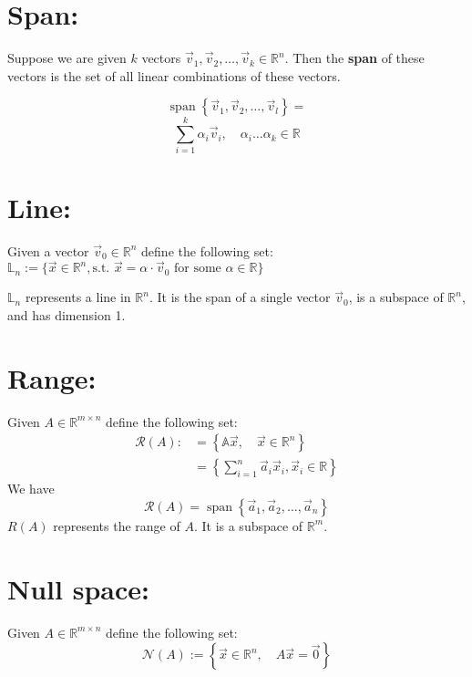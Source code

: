\section{\small Span:}

Suppose we are given $k$ vectors $\vec{v}_1, \vec{v}_2, \ldots, \vec{v}_k
	\in \mathbb{R}^n$. Then the \textbf{span} of these vectors is the set of
all linear combinations of these vectors.

\[
	\operatorname{span} \left\{ \vec{v}_1, \vec{v}_2, \ldots, \vec{v}_l \right\}
	=
\]
\[
	\sum_{i = 1}^k \alpha_i \vec{v}_i, \quad \alpha_i \ldots \alpha_k \in \mathbb{R}
\]

\section{\small Line:}
Given a vector $\vec{v}_0 \in \mathbb{R}^n$ define the following set:\\
$ \mathbb{L}_n := \{ \vec{x} \in \mathbb{R}^n, \text{s.t. } \vec{x} = \alpha
	\cdot \vec{v}_0 \text{ for some } \alpha \in \mathbb{R} \} $

$\mathbb{L}_n$ represents a line in $\mathbb{R}^n$. It is the span of a single
vector $\vec{v}_0$, is a subspace of $\mathbb{R}^n$, and has dimension 1.

\section{\small Range:}
Given $A \in \mathbb{R}^{m \times n}$ define the following set:
\[
	\begin{aligned}
		\mathcal{R}(A) : & = \left\{ \mathbb{A} \vec{x}, \quad \vec{x} \in \mathbb{R}^n
		\right\}                                                                        \\
		                 & = \left\{ \sum_{i = 1}^n \vec{a}_i\vec{x}_i, \vec{x}_i \in
		\mathbb{R} \right\}
	\end{aligned}
\]
We have
\[
	\mathcal{R}(A) = \operatorname{span} \left\{ \vec{a}_1, \vec{a}_2, \ldots, \vec{a}_n \right\}
\]
$R(A)$ represents the range of $A$. It is a subspace of $\mathbb{R}^m$.

\section{\small Null space:}
Given $A \in \mathbb{R}^{m \times n}$ define the following set:
\[
	\mathcal{N}(A) := \left\{ \vec{x} \in \mathbb{R}^n, \quad A \vec{x} = \vec{0} \right\}
\]
